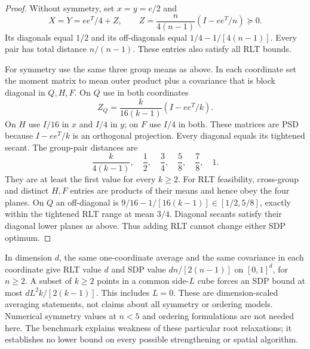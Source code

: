 \begin{proof}
Without symmetry, set $x=y=e/2$ and
\begin{equation}\label{eq:packing-covariance}
 X=Y=ee^T/4+Z,\qquad
 Z=\frac{n}{4(n-1)}(I-ee^T/n)\succeq0.
\end{equation}
Its diagonals equal $1/2$ and its off-diagonals equal
$1/4-1/[4(n-1)]$. Every pair has total distance $n/(n-1)$.
These entries also satisfy all RLT bounds.

For symmetry use the same three group means as above. In each coordinate
set the moment matrix to mean outer product plus a covariance that is
block diagonal in $Q,H,F$. On $Q$ use in both coordinates
\[
 Z_Q=\frac{k}{16(k-1)}(I-ee^T/k).
\]
On $H$ use $I/16$ in $x$ and $I/4$ in $y$; on $F$ use $I/4$ in both.
These matrices are PSD because $I-ee^T/k$ is an orthogonal projection.
Every diagonal equals its tightened secant. The group-pair distances are
\[
 \frac{k}{4(k-1)},\quad\frac12,\quad\frac34,\quad
 \frac58,\quad\frac78,\quad1.
\]
They are at least the first value for every $k\ge2$.
For RLT feasibility, cross-group and distinct $H,F$ entries are products
of their means and hence obey the four planes. On $Q$ an off-diagonal is
$9/16-1/[16(k-1)]\in[1/2,5/8]$, exactly within the tightened RLT range
at mean $3/4$. Diagonal secants satisfy their diagonal lower planes as
above. Thus adding RLT cannot change either SDP optimum.
\end{proof}

In dimension $d$, the same one-coordinate average and the same covariance
in each coordinate give RLT value $d$ and SDP value
$dn/[2(n-1)]$ on $[0,1]^d$, for $n\ge2$. A subset of $k\ge2$ points
in a common side-$L$ cube forces an SDP bound at most
$dL^2k/[2(k-1)]$. This includes $L=0$. These are dimension-scaled
averaging statements, not claims about all symmetry or ordering models.
Numerical symmetry values at $n<5$ and ordering formulations are not
needed here. The benchmark explains weakness of these particular root
relaxations; it establishes no lower bound on every possible strengthening
or spatial algorithm.
